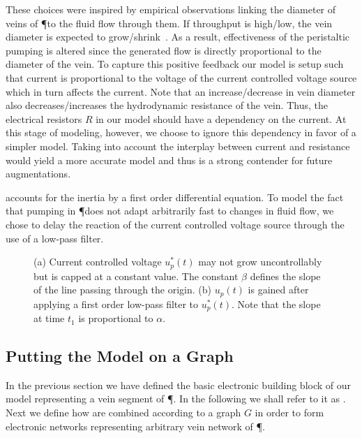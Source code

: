 These choices were inspired by empirical observations linking the diameter of veins of \P to the fluid flow through them. If throughput is high/low, the vein diameter is expected to grow/shrink~\cite{nakagaki2000intelligence}. As a result, effectiveness of the peristaltic pumping is altered since the generated flow is directly proportional to the diameter of the vein. To capture this positive feedback our model is setup such that current is proportional to the voltage of the current controlled voltage source which in turn affects the current. Note that an increase/decrease in vein diameter also decreases/increases the hydrodynamic resistance of the vein. Thus, the electrical resistors $R$ in our model should have a dependency on the current. At this stage of modeling, however, we choose to ignore this dependency in favor of a simpler model. Taking into account the interplay between current and resistance would yield a more accurate model and thus is a strong contender for future augmentations.

 accounts for the inertia by a first order differential equation. To model the fact that pumping in \P does not adapt arbitrarily fast to changes in fluid flow, we chose to delay the reaction of the current controlled voltage source through the use of a low-pass filter.
  
\begin{figure}
    \centering
        \subfloat[]{%
    \label{fig:steady}%
    }%
    \qquad
      \subfloat[]{%
    \label{fig:transient}%
    }%
      \caption[Definitions for current controlled voltage sources]{(a) Current controlled voltage $u^*_p(t)$ may not grow uncontrollably but is capped at a constant value. The constant $\beta$ defines the slope of the line passing through the origin. (b) $u_p(t)$ is gained after applying a first order low-pass filter to $u^*_p(t)$. Note that the slope
      at time $t_1$ is proportional to $\alpha$.}
\end{figure}


\subsection{Putting the Model on a Graph}

  In the previous section we have defined the basic electronic building block of our model representing a vein segment of \P. In the following we shall refer to it as \Pe. Next we define how \Pes are combined according to a graph $G$ in order to form electronic networks representing arbitrary vein network of \P.

